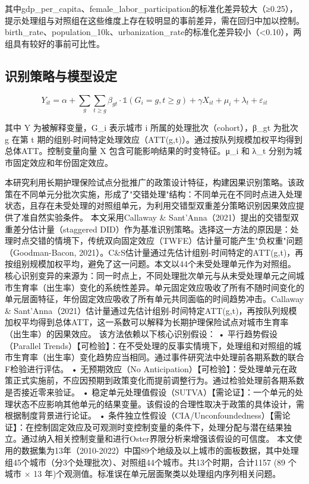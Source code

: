 \documentclass[11pt,a4paper]{article}
\begin{document}
其中gdp\_per\_capita、female\_labor\_participation的标准化差异较大（≥0.25），提示处理组与对照组在这些维度上存在较明显的事前差异，需在回归中加以控制。birth\_rate、population\_10k、urbanization\_rate的标准化差异较小（<0.10），两组具有较好的事前可比性。

\subsection{识别策略与模型设定}

\[Y_{it} = \alpha + \sum_{g} \sum_{t \ge g} \beta_{gt} \cdot \mathbb{1}(G_i=g, t \ge g) + \gamma X_{it} + \mu_i + \lambda_t + \varepsilon_{it}\]

其中 Y 为被解释变量，G\_i 表示城市 i 所属的处理批次（cohort），β\_{gt} 为批次 g 在第 t 期的组别-时间特定处理效应（ATT(g,t)）。通过按队列规模加权平均得到总体ATT。控制变量向量 X 包含可能影响结果的时变特征。μ\_i 和 λ\_t 分别为城市固定效应和年份固定效应。

本研究利用长期护理保险试点分批推广的政策设计特征，构建因果识别策略。该政策在不同单元分批次实施，形成了"交错处理"结构：不同单元在不同时点进入处理状态，且存在未受处理的对照组单元，为利用交错型双重差分策略识别因果效应提供了准自然实验条件。
本文采用Callaway \& Sant'Anna（2021）提出的交错型双重差分估计量（staggered DID）作为基准识别策略。选择这一方法的原因是：处理时点交错的情境下，传统双向固定效应（TWFE）估计量可能产生"负权重"问题（Goodman-Bacon, 2021）。C\&S估计量通过先估计组别-时间特定的ATT(g,t)，再按组别规模加权平均，避免了这一问题。本文以44个未受处理单元作为对照组。
核心识别变异的来源为：同一时点上，不同处理批次单元与从未受处理单元之间城市生育率（出生率）变化的系统性差异。单元固定效应吸收了所有不随时间变化的单元层面特征，年份固定效应吸收了所有单元共同面临的时间趋势冲击。Callaway \& Sant'Anna（2021）估计量通过先估计组别-时间特定ATT(g,t)，再按队列规模加权平均得到总体ATT，这一系数可以解释为长期护理保险试点对城市生育率（出生率）的因果效应。
该方法依赖以下核心识别假设：
  • 平行趋势假设（Parallel Trends）【可检验】：在不受处理的反事实情境下，处理组和对照组的城市生育率（出生率）变化趋势应当相同。通过事件研究法中处理前各期系数的联合F检验进行评估。
  • 无预期效应（No Anticipation）【可检验】：受处理单元在政策正式实施前，不应因预期到政策变化而提前调整行为。通过检验处理前各期系数是否接近零来验证。
  • 稳定单元处理值假设（SUTVA）【需论证】：一个单元的处理状态不应影响其他单元的结果变量。该假设的合理性取决于政策的具体设计，需根据制度背景进行论证。
  • 条件独立性假设（CIA/Unconfoundedness）【需论证】：在控制固定效应及可观测时变控制变量的条件下，处理分配与潜在结果独立。通过纳入相关控制变量和进行Oster界限分析来增强该假设的可信度。
本文使用的数据集为13年（2010-2022）中国89个地级及以上城市的面板数据，其中处理组45个城市（分3个处理批次）、对照组44个城市。共13个时期，合计1157 (89 个城市 × 13 年)个观测值。标准误在单元层面聚类以处理组内序列相关问题。
\end{document}
